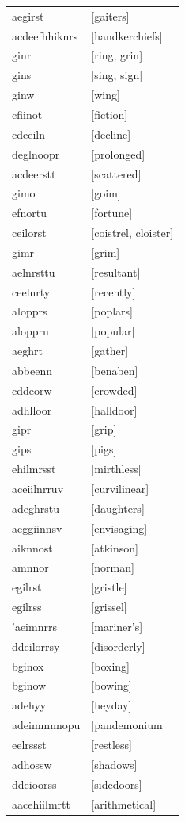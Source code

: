 \documentclass{article}
\begin{document}
\begin{tabular}{ll}
aegirst & [gaiters] \\
acdeefhhiknrs & [handkerchiefs] \\
ginr & [ring, grin] \\
gins & [sing, sign] \\
ginw & [wing] \\
cfiinot & [fiction] \\
cdeeiln & [decline] \\
deglnoopr & [prolonged] \\
acdeerstt & [scattered] \\
gimo & [goim] \\
efnortu & [fortune] \\
ceilorst & [coistrel, cloister] \\
gimr & [grim] \\
aelnrsttu & [resultant] \\
ceelnrty & [recently] \\
alopprs & [poplars] \\
aloppru & [popular] \\
aeghrt & [gather] \\
abbeenn & [benaben] \\
cddeorw & [crowded] \\
adhlloor & [halldoor] \\
gipr & [grip] \\
gips & [pigs] \\
ehilmrsst & [mirthless] \\
aceiilnrruv & [curvilinear] \\
adeghrstu & [daughters] \\
aeggiinnsv & [envisaging] \\
aiknnost & [atkinson] \\
amnnor & [norman] \\
egilrst & [gristle] \\
egilrss & [grissel] \\
'aeimnrrs & [mariner's] \\
ddeilorrsy & [disorderly] \\
bginox & [boxing] \\
bginow & [bowing] \\
adehyy & [heyday] \\
adeimmnnopu & [pandemonium] \\
eelrssst & [restless] \\
adhossw & [shadows] \\
ddeioorss & [sidedoors] \\
aacehiilmrtt & [arithmetical] \\

\end{tabular}
\end{document}
